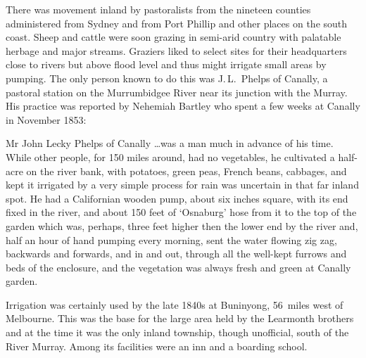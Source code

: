 There was movement inland by pastoralists from the nineteen counties
administered from Sydney  and from Port Phillip
 and other places on the south coast.  Sheep and
cattle were soon grazing in semi-arid country with palatable herbage
and major streams.  Graziers liked to select sites for their
headquarters close to rivers but above flood level and thus might
irrigate small areas by pumping.  The only person known to do this was
J.\,L.~Phelps  of Canally,
 a
pastoral station on the Murrumbidgee River 
near its junction with the Murray.  His practice
was reported by Nehemiah Bartley  who spent a few
weeks at Canally in November 1853:
\begin{Quote}
	Mr John Lecky Phelps of Canally \ldots was a man much in
	advance of his time.  While other people, for 150 miles
	around, had no vegetables, he cultivated a half-acre on the
	river bank, with potatoes, green peas, French beans, cabbages,
	and kept it irrigated by a very simple process for rain was
	uncertain in that far inland spot.  He had a Californian
	wooden pump, about six inches square, with its end fixed in
	the river, and about 150 feet of `Osnaburg' hose from it to
	the top of the garden which was, perhaps, three feet higher
	then the lower end by the river and, half an hour of hand
	pumping every morning, sent the water flowing zig zag,
	backwards and forwards, and in and out, through all the
	well-kept furrows and beds of the enclosure, and the
	vegetation was always fresh and green at Canally
	garden.
\end{Quote}

Irrigation was certainly used by the late 1840s at Buninyong,
 56~miles
west of Melbourne.  This was the base for the large area held by the
Learmonth brothers  and at the time it was the
only inland township, though unofficial, south of the River Murray.
Among its facilities were an inn and a boarding school.

